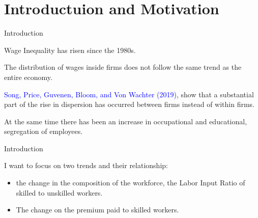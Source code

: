 \documentclass[notes,11pt, aspectratio=169]{beamer}
\newenvironment{wideitemize}{\itemize\addtolength{\itemsep}{10pt}}{\enditemize}
\begin{document}
\section{Introductuion and Motivation}
\begin{frame}{Introduction}
\begin{wideitemize}
 \item Wage Inequality has risen since the 1980s.
 \item The distribution of wages inside firms does not follow the same trend as the entire economy.
 \item \textcolor{blue}{Song, Price, Guvenen, Bloom, and Von Wachter (2019)}, show that a substantial part of the rise in dispersion has occurred between firms instead of within firms.
 \item At the same time there has been an increase in occupational and educational, segregation of employees.
\end{wideitemize}
\end{frame}

\begin{frame}{Introduction}
\begin{wideitemize}
 \item I want to focus on two trends and their relationship:
 \begin{itemize}
 \item the change in the composition of the workforce, the Labor Input Ratio of skilled to unskilled workers.
 \item The change on the premium paid to skilled workers.
 \end{itemize}
\end{wideitemize}
\end{frame}
\end{document}
